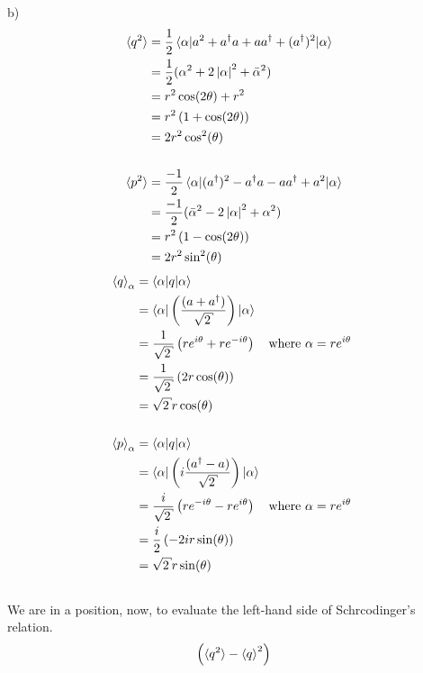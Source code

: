 \begin{homeworkProblem}[Problem 10]
\begin{homeworkSection}{b)}
\begin{align}
   \braket{q^2} &= \frac{1}{2}
   \braket{\alpha |
   a^{2} + a^{\dagger}a + aa^{\dagger} + (a^{\dagger})^{2} | \alpha } \\
   &= \frac{1}{2}(\alpha^{2} + 2 \left| \alpha \right|^{2} + \bar{\alpha}^2 )\\
   &= r^{2} \cos(2\theta) + r^{2} \\
   &= r^{2} \left( 1 + \cos(2\theta) \right) \\
   &= 2 r^{2} \cos^{2}(\theta) \\ \nonumber \\
   \braket{p^2}
   &= \frac{-1}{2}
   \braket{\alpha |
   (a^\dagger)^{2} - a^{\dagger}a - aa^{\dagger} + a^{2} | \alpha } \\
   &= \frac{-1}{2}( \bar{\alpha}^2 - 2 \left| \alpha \right|^{2} + \alpha^{2}) \\
   &= r^{2} \left( 1 - \cos(2\theta) \right) \\
   &= 2 r^{2} \sin^{2}(\theta)
\end{align}
\begin{align} %
   \braket{q}_{\alpha} &= \braket{\alpha | q | \alpha} \\
                       &= \braket{\alpha |
   \left(\frac{(a+a^{\dagger})}{\sqrt{2}} \right)
| \alpha} \\
&= \frac{1}{\sqrt{2}} \left( r e^{i \theta} + r e^{- i \theta} \right)
\text{\quad where $\alpha = r e^{i \theta}$ } \\
&= \frac{1}{\sqrt{2}} \left( 2 r \cos(\theta) \right) \\
&= \sqrt{2} r  \cos(\theta) \\ \nonumber \\
\braket{p}_{\alpha} &= \braket{\alpha | q | \alpha} \\
                    &= \braket{\alpha |
\left(i\frac{(a^{\dagger}-a)}{\sqrt{2}} \right) | \alpha} \\
&= \frac{i}{\sqrt{2}} \left( r e^{-i \theta} - r e^{i \theta} \right)
\text{\quad where $\alpha = r e^{i \theta}$ } \\
&= \frac{i}{2} \left( - 2 i r \sin(\theta) \right) \\
&= \sqrt{2} r  \sin(\theta) \\ \nonumber \\
   \end{align}
   We are in a position, now, to evaluate the left-hand side of Schrcodinger's
   relation.
   \begin{align}
      \left( \braket{q^2} - \braket{q}^2 \right)

\end{align}
\end{homeworkSection}
\end{homeworkProblem}
